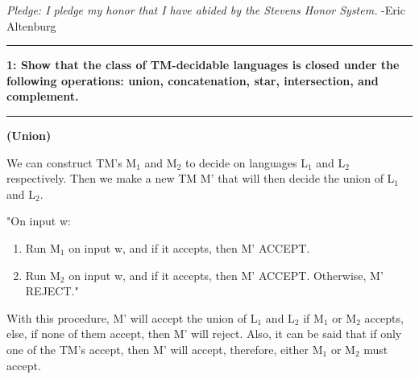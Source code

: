 \documentclass[11pt]{article}
\newcommand\question[2]{\vspace{.25in}\hrule\textbf{#1: #2}\vspace{.5em}\hrule\vspace{.10in}}
\renewcommand\part[1]{\vspace{.10in}\textbf{(#1)}\par}
\begin{document}
\raggedright
\newcommand\NAME{Eric Altenburg}  %
\newcommand\COURSE{CS-334}
\newcommand\HWNUM{7}              %


\textit{Pledge: I pledge my honor that I have abided by the Stevens Honor System.} -Eric Altenburg

\question{1}{Show that the class of TM-decidable languages is closed under the following operations:  union, concatenation, star, intersection, and complement.}
	\part{Union}
		We can construct TM's M$_{1}$ and M$_{2}$ to decide on languages L$_{1}$ and L$_{2}$ respectively. Then we make a new TM M' that will then decide the union of L$_{1}$ and L$_{2}$.\par
		"On input w:
		\begin{enumerate}
			\item Run M$_{1}$ on input w, and if it accepts, then M' ACCEPT.
			\item Run M$_{2}$ on input w, and if it accepts, then M' ACCEPT. Otherwise, M' REJECT."
		\end{enumerate}
		With this procedure, M' will accept the union of L$_{1}$ and L$_{2}$ if M$_{1}$ or M$_{2}$ accepts, else, if none of them accept, then M' will reject. Also, it can be said that if only one of the TM's accept, then M' will accept, therefore, either M$_{1}$ or M$_{2}$ must accept.
	
\end{document}
